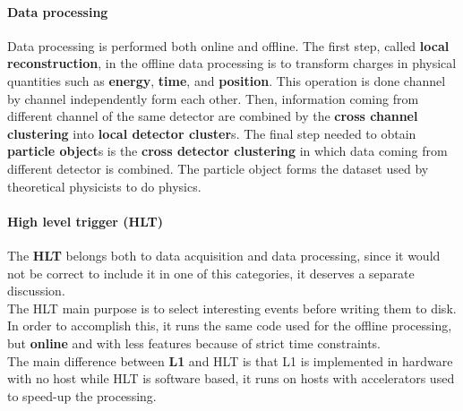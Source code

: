 \paragraph{Data processing} 
Data processing is performed both online and offline. %
The first step, called \textbf{local reconstruction}, in the offline data processing is to transform charges in physical quantities such as \textbf{energy}, \textbf{time}, and \textbf{position}. This operation is done channel by channel independently form each other. Then, information coming from different channel of the same detector are combined by the \textbf{cross channel clustering} into \textbf{local detector cluster}s. The final step needed to obtain \textbf{particle object}s is the \textbf{cross detector clustering} in which data coming from different detector is combined. The particle object forms the dataset used by theoretical physicists to do physics. \\
\paragraph{High level trigger (HLT)}
The \textbf{HLT} belongs both to data acquisition and data processing, since it would not be correct to include it in one of this categories, it deserves a separate discussion. \\
The HLT main purpose is to select interesting events before writing them to disk. In order to accomplish this, it runs the same code used for the offline processing, but \textbf{online} and with less features because of strict time constraints. \\
The main difference between \textbf{L1} and HLT is that L1 is implemented in hardware with no host while HLT is software based, it runs on hosts with accelerators used to speed-up the processing.
